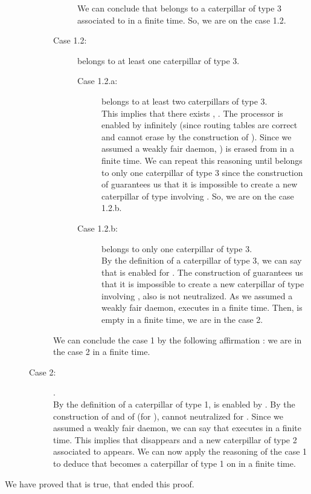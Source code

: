 \documentclass[11pt]{article}
\newenvironment{proof}{{\noindent\bf Proof. } }{{\hfill }}
\begin{document}
\begin{proof}
\begin{description}
\begin{description}
\begin{description}
We can conclude that  belongs to a caterpillar of type 3 associated to  in a finite time. So, we are on the case 1.2.

\item [Case 1.2:]  belongs to at least one caterpillar of type 3.

\begin{description}
\item [Case 1.2.a:]  belongs to at least two caterpillars of type 3.\\
This implies that there exists , . The processor  is enabled by  infinitely (since routing tables are correct and  cannot erase  by the construction of ). Since we assumed a weakly fair daemon, ) is erased from  in a finite time. We can repeat this reasoning until  belongs to only one caterpillar of type 3 since the construction of  guarantees us that it is impossible to create a new caterpillar of type  involving . So, we are on the case 1.2.b.
\item [Case 1.2.b:]  belongs to only one caterpillar of type 3.\\
By the definition of a caterpillar of type 3, we can say that  is enabled for . The construction of  guarantees us that it is impossible to create a new caterpillar of type  involving , also  is not neutralized. As we assumed a weakly fair daemon,   executes  in a finite time. Then,  is empty in a finite time, we are in the case 2.
\end{description}

\end{description}

We can conclude the case 1 by the following affirmation : we are in the case 2 in a finite time.

\item [Case 2:] .\\
By the definition of a caterpillar of type 1,  is enabled by . By the construction of  and of  (for ),  cannot neutralized for . Since we assumed a weakly fair daemon, we can say that  executes  in a finite time. This implies that  disappears and a new caterpillar  of type 2 associated to  appears. We can now apply the reasoning of the case 1 to deduce that  becomes a caterpillar of type 1 on  in a finite time.
\end{description}

\end{description}

We have proved that  is true, that ended this proof.
\end{proof}
\end{document}
